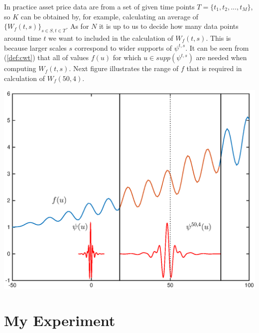 \documentclass[a4paper]{article}
\begin{document}
In practice asset price data are from a set of given time points $T = \{t_1,t_2,...,t_M\}$, so $K$ can be obtained by, for example, calculating an average of $\{ W_f(t,s)\}_{s\in S, t\in T}$. As for $N$ it is up to us to decide how many data points around time $t$ we want to included in the calculation of $W_f(t,s)$. This is because larger scales $s$ correspond to wider supports of $\psi^{t,s}$. It can be seen from (\ref{def:cwt}) that all of values $f(u)$ for which $u \in supp(\psi^{t,s})$ are needed when computing $W_f(t,s)$. Next figure illustrates the range of $f$ that is required in calculation of $W_f(50,4)$.

\includegraphics[width=\textwidth]{wavsupport.eps}

\section{My Experiment}
\end{document}
